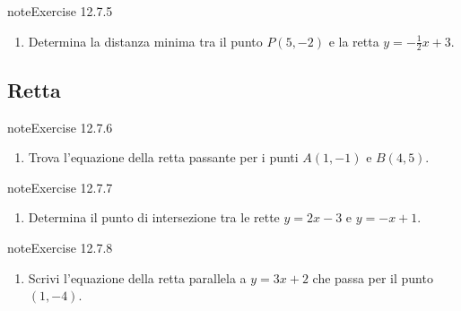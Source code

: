 \documentclass[letterpaper,10pt,italian]{jupyterBook}
\begin{document}
\begin{sphinxadmonition}{note}{Exercise 12.7.5}


\begin{enumerate}
%
\setcounter{enumi}{4}
\item {} 
\sphinxAtStartPar
Determina la distanza minima tra il punto \( P(5, -2) \) e la retta \( y = -\frac{1}{2}x + 3 \).

\end{enumerate}
\end{sphinxadmonition}


\subsection{Retta}
\label{\detokenize{ch/analytic_geometry/analytic_geometry_2d/problems:retta}} \label{exercise:ch/analytic_geometry/analytic_geometry_2d/problems-exercise-5}

\begin{sphinxadmonition}{note}{Exercise 12.7.6}


\begin{enumerate}
%
\setcounter{enumi}{5}
\item {} 
\sphinxAtStartPar
Trova l’equazione della retta passante per i punti \( A(1, -1) \) e \( B(4, 5) \).

\end{enumerate}
\end{sphinxadmonition}
 \label{exercise:ch/analytic_geometry/analytic_geometry_2d/problems-exercise-6}

\begin{sphinxadmonition}{note}{Exercise 12.7.7}


\begin{enumerate}
%
\setcounter{enumi}{6}
\item {} 
\sphinxAtStartPar
Determina il punto di intersezione tra le rette \( y = 2x - 3 \) e \( y = -x + 1 \).

\end{enumerate}
\end{sphinxadmonition}
 \label{exercise:ch/analytic_geometry/analytic_geometry_2d/problems-exercise-7}

\begin{sphinxadmonition}{note}{Exercise 12.7.8}


\begin{enumerate}
%
\setcounter{enumi}{7}
\item {} 
\sphinxAtStartPar
Scrivi l’equazione della retta parallela a \( y = 3x + 2 \) che passa per il punto \( (1, -4) \).

\end{enumerate}
\end{sphinxadmonition}
 \label{exercise:ch/analytic_geometry/analytic_geometry_2d/problems-exercise-8}
\end{document}
